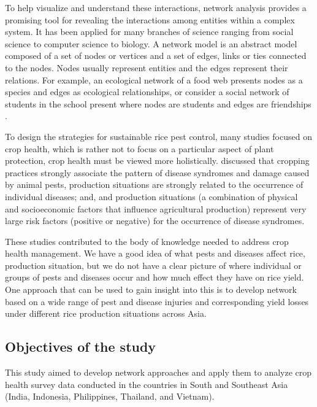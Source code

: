 To help visualize and understand these interactions, network analysis provides a promising tool for revealing the interactions among entities within a complex system. It has been applied for many branches of science ranging from social science to computer science to biology. A network model is an abstract model composed of a set of nodes or vertices and a set of edges, links or ties connected to the nodes. Nodes usually represent entities and the edges represent their relations. For example, an ecological network of a food web presents nodes as a species \citep{Krause_2003_Compartments} and edges as ecological relationships, or consider a social network of students in the school present where nodes are students and edges are friendships \citep{Moody_2001_Race}.

To design the strategies for sustainable  rice pest control, many studies focused on crop health, which is rather not to focus on a particular aspect of plant protection, crop health must be viewed more holistically. \citet{Savary_1995_Use,Savary_2000_Quantification,Savary_2005_Multiple} discussed that cropping practices strongly associate the pattern of disease syndromes and damage caused by animal pests, production situations are strongly related to the occurrence of  individual diseases; and, and production situations (a combination of physical and socioeconomic factors that influence agricultural production) represent very large risk factors (positive or negative) for the occurrence of disease syndromes. 

These studies contributed to the body of knowledge needed to address crop health management. We have a good idea of what pests and diseases affect rice, production situation, but we do not have a clear picture of where individual or groups of pests and diseases occur and how much effect they have on rice yield. One approach that can be used to gain insight into this is to develop network based on a wide range of pest and disease injuries and corresponding yield losses under different rice production situations across Asia. 

\subsection{Objectives of the study}
This study aimed to develop network approaches and apply them to analyze crop health survey data conducted in the countries in South and Southeast Asia (India, Indonesia, Philippines, Thailand, and Vietnam). 

